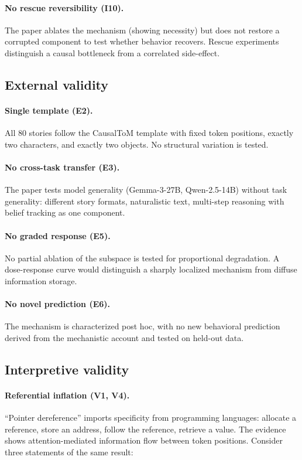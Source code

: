 \documentclass{article}
\begin{document}
\paragraph{No rescue reversibility (I10).}
The paper ablates the mechanism (showing necessity) but does not restore a corrupted component to test whether behavior recovers. Rescue experiments distinguish a causal bottleneck from a correlated side-effect.

\subsection{External validity}

\paragraph{Single template (E2).}
All 80 stories follow the CausalToM template with fixed token positions, exactly two characters, and exactly two objects. No structural variation is tested.

\paragraph{No cross-task transfer (E3).}
The paper tests model generality (Gemma-3-27B, Qwen-2.5-14B) without task generality: different story formats, naturalistic text, multi-step reasoning with belief tracking as one component.

\paragraph{No graded response (E5).}
No partial ablation of the subspace is tested for proportional degradation. A dose-response curve would distinguish a sharply localized mechanism from diffuse information storage.

\paragraph{No novel prediction (E6).}
The mechanism is characterized post hoc, with no new behavioral prediction derived from the mechanistic account and tested on held-out data.

\subsection{Interpretive validity}

\paragraph{Referential inflation (V1, V4).}
``Pointer dereference'' imports specificity from programming languages: allocate a reference, store an address, follow the reference, retrieve a value. The evidence shows attention-mediated information flow between token positions. Consider three statements of the same result:
\end{document}
